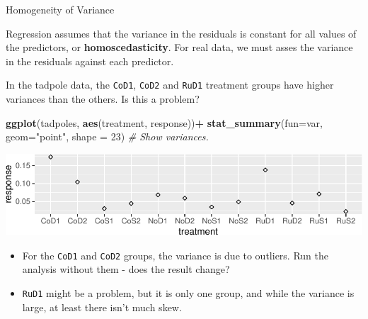 \documentclass[
  ignorenonframetext,
]{beamer}
\newenvironment{Shaded}{\begin{snugshade}}{\end{snugshade}}
\newcommand{\CommentTok}[1]{\textcolor[rgb]{0.56,0.35,0.01}{\textit{#1}}}
\newcommand{\DataTypeTok}[1]{\textcolor[rgb]{0.13,0.29,0.53}{#1}}
\newcommand{\DecValTok}[1]{\textcolor[rgb]{0.00,0.00,0.81}{#1}}
\newcommand{\KeywordTok}[1]{\textcolor[rgb]{0.13,0.29,0.53}{\textbf{#1}}}
\newcommand{\NormalTok}[1]{#1}
\newcommand{\OperatorTok}[1]{\textcolor[rgb]{0.81,0.36,0.00}{\textbf{#1}}}
\newcommand{\StringTok}[1]{\textcolor[rgb]{0.31,0.60,0.02}{#1}}
\providecommand{\tightlist}{%
  \setlength{\itemsep}{0pt}\setlength{\parskip}{0pt}}
\begin{document}
\begin{frame}[fragile]{Homogeneity of Variance}
\protect\hypertarget{homogeneity-of-variance}{}

Regression assumes that the variance in the residuals is constant for
all values of the predictors, or \textbf{homoscedasticity}. For real
data, we must asses the variance in the residuals against each
predictor.

In the tadpole data, the \texttt{CoD1}, \texttt{CoD2} and \texttt{RuD1}
treatment groups have higher variances than the others. Is this a
problem? \scriptsize

\begin{Shaded}
\begin{Highlighting}[]
\KeywordTok{ggplot}\NormalTok{(tadpoles, }\KeywordTok{aes}\NormalTok{(treatment, response))}\OperatorTok{+}
\StringTok{  }\KeywordTok{stat_summary}\NormalTok{(}\DataTypeTok{fun=}\NormalTok{var, }\DataTypeTok{geom=}\StringTok{"point"}\NormalTok{, }\DataTypeTok{shape =} \DecValTok{23}\NormalTok{) }\CommentTok{# Show variances.}
\end{Highlighting}
\end{Shaded}

\includegraphics{Regression_and_ANOVA_files/figure-beamer/unnamed-chunk-19-1.pdf}
\normalsize

\begin{itemize}
\tightlist
\item
  For the \texttt{CoD1} and \texttt{CoD2} groups, the variance is due to
  outliers. Run the analysis without them - does the result change?
\item
  \texttt{RuD1} might be a problem, but it is only one group, and while
  the variance is large, at least there isn't much skew.
\end{itemize}

\end{frame}
\end{document}
